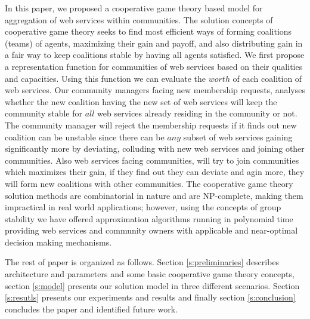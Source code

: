 \documentclass[10pt, conference, compsocconf]{IEEEtran}
\theoremstyle{plain}
\theoremstyle{definition}
\begin{document}
In this paper, we proposed a cooperative game theory based model for aggregation of web services within communities. The solution concepts of cooperative game theory seeks to find most efficient ways of forming coalitions (teams) of agents, maximizing their gain and payoff, and also distributing gain in a fair way to keep coalitions stable by having all agents satisfied. We first propose a representation function for communities of web services based on their qualities and capacities. Using this function we can evaluate the $worth$ of each coalition of web services. Our community managers facing new membership requests, analyses whether the new coalition having the new set of web services will keep the community stable for $all$ web services already residing in the community or not. The community manager will reject the membership requests if it finds out new coalition can be unstable since there can be $any$ subset of web services gaining significantly more by deviating, colluding with new web services and joining other communities. Also web services facing communities, will try to join communities which maximizes their gain, if they find out they can deviate and agin more, they will form new coalitions with other communities. The cooperative game theory solution methods are combinatorial in nature and are NP-complete, making them impractical in real world applications; however, using the concepts of group stability we have offered approximation algorithms running in polynomial time providing web services and community owners with applicable and near-optimal decision making mechanisms.

The rest of paper is organized as follows. Section \ref{s:preliminaries} describes architecture and parameters and some basic cooperative game theory concepts, section \ref{s:model} presents our solution model in three different scenarios. Section \ref{s:resutls} presents our experiments and results and finally section \ref{s:conclusion} concludes the paper and identified future work.



\end{document}
